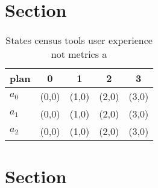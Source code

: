 \documentclass[a4paper]{article}
\begin{document}
\section{Section}

\begin{table}
\begin{adjustbox}{width=0.5\columnwidth}
\begin{tabular}{|l|l|l|l|l|}
\hline
\textbf{plan} & \multicolumn{1}{c|}{\textbf{0}} & \multicolumn{1}{c|}{\textbf{1}} & \multicolumn{1}{c|}{\textbf{2}} & \multicolumn{1}{c|}{\textbf{3}} \\ \hline
\textbf{$a_0$}  & (0,0) & (1,0) & (2,0) & (3,0) \\ \hline
\textbf{$a_1$}  & (0,0) & (1,0) & (2,0) & (3,0) \\ \hline
\textbf{$a_2$}  & (0,0) & (1,0) & (2,0) & (3,0) \\ \hline
\end{tabular}
\end{adjustbox}
\caption{States census tools user experience not metrics a
}
\end{table}

\section{Section}
\end{document}
